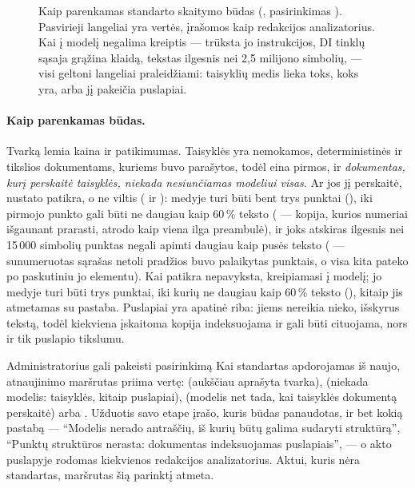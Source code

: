 \begin{figure}[H]
\actorlegend
\caption{Kaip parenkamas standarto skaitymo būdas (, pasirinkimas
). Pasvirieji langeliai yra vertės, įrašomos kaip redakcijos analizatorius. Kai į
modelį negalima kreiptis --- trūksta jo instrukcijos, DI tinklų sąsaja grąžina klaidą, tekstas
ilgesnis nei 2,5 milijono simbolių, --- visi geltoni langeliai praleidžiami: taisyklių medis
lieka toks, koks yra, arba jį pakeičia puslapiai.}\label{fig:corpus:standard}
\end{figure}

\paragraph{Kaip parenkamas būdas.} Tvarką lemia kaina ir patikimumas. Taisyklės yra nemokamos,
deterministinės ir tikslios dokumentams, kuriems buvo parašytos, todėl eina pirmos, ir
\emph{dokumentas, kurį perskaitė taisyklės, niekada nesiunčiamas modeliui visas}. Ar jos jį
perskaitė, nustato patikra, o ne viltis ( ir ): medyje turi
būti bent trys punktai (), iki pirmojo punkto gali būti ne daugiau
kaip 60\,\% teksto ( --- kopija, kurios numeriai išgaunant prarasti,
atrodo kaip viena ilga preambulė), ir joks atskiras ilgesnis nei 15\,000 simbolių punktas negali
apimti daugiau kaip pusės teksto ( --- sunumeruotas sąrašas netoli
pradžios buvo palaikytas punktais, o visa kita pateko po paskutiniu jo elementu). Kai patikra
nepavyksta, kreipiamasi į modelį; jo medyje turi būti trys punktai, iki kurių ne daugiau kaip
60\,\% teksto (), kitaip jis atmetamas su pastaba. Puslapiai yra apatinė
riba: jiems nereikia nieko, išskyrus tekstą, todėl kiekviena įskaitoma kopija indeksuojama ir
gali būti cituojama, nors ir tik puslapio tikslumu.

\begin{humanbox}{Administratorius gali pakeisti pasirinkimą}
Kai standartas apdorojamas iš naujo, atnaujinimo maršrutas priima  vertę:
 (aukščiau aprašyta tvarka),  (niekada modelis: taisyklės, kitaip
puslapiai),  (modelis net tada, kai taisyklės dokumentą perskaitė) arba .
Užduotis savo  etape įrašo, kuris būdas panaudotas, ir bet kokią pastabą ---
\enquote{Modelis nerado antraščių, iš kurių būtų galima sudaryti struktūrą}, \enquote{Punktų
struktūros nerasta: dokumentas indeksuojamas puslapiais}, --- o akto puslapyje rodomas
kiekvienos redakcijos analizatorius. Aktui, kuris nėra standartas, maršrutas šią parinktį
atmeta.
\end{humanbox}

